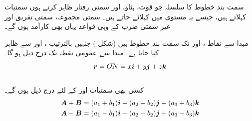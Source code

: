 سمت بند خطوط کا سلسلہ جو قوت، ہٹاو، اور سمتی رفتار ظاہر کرتے ہوں سمتیات کہلاتے ہیں، جیسے یہ مستوی میں کہلائے جاتے ہیں۔ سمتی مجموعہ، سمتی تفریق اور غیر سمتی ضرب کے وہی قواعد یہاں بھی کارآمد ہوں گے۔

مبدا سے نقاط ،  اور  تک سمت بند خطوط  ہیں (شکل ) جنہیں بالترتیب ،  اور  سے ظاہر کیا جاتا ہے۔ مبدا  سے عمومی نقطہ  تک   درج ذیل ہو گا۔
\begin{align}
\kvec{r}=\krightharpoonup{ON}=x\ai+y\aj+z\ak
\end{align}
\\
کسی بھی سمتیات  اور  کے لئے درج ذیل ہوں گے۔
\begin{align*}
{\ensuremath{{\boldsymbol{A}}}}+{{\boldsymbol{B}}}&=(a_1+b_1){\boldsymbol{i}}+(a_2+b_2){\boldsymbol{j}}+(a_3+b_3){\boldsymbol{k}}\\
{{\boldsymbol{A}}}-{{\boldsymbol{B}}}&=(a_1-b_1){\boldsymbol{i}}+(a_2-b_2){\boldsymbol{j}}+(a_3-b_3){\boldsymbol{k}}
\end{align*}
